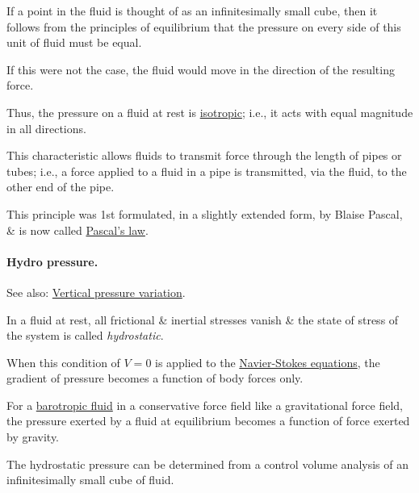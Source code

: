 \documentclass{article}
\begin{document}
If a point in the fluid is thought of as an infinitesimally small cube, then it follows from the principles of equilibrium that the pressure on every side of this unit of fluid must be equal.

If this were not the case, the fluid would move in the direction of the resulting force.

Thus, the pressure on a fluid at rest is \href{https://en.wikipedia.org/wiki/Isotropic}{isotropic}; i.e., it acts with equal magnitude in all directions.

This characteristic allows fluids to transmit force through the length of pipes or tubes; i.e., a force applied to a fluid in a pipe is transmitted, via the fluid, to the other end of the pipe.

This principle was 1st formulated, in a slightly extended form, by Blaise Pascal, \& is now called \href{https://en.wikipedia.org/wiki/Pascal's_law}{Pascal's law}.

\paragraph{Hydro pressure.} See also: \href{https://en.wikipedia.org/wiki/Vertical_pressure_variation}{Vertical pressure variation}.

%
In a fluid at rest, all frictional \& inertial stresses vanish \& the state of stress of the system is called {\it hydrostatic}.

When this condition of $V = 0$ is applied to the \href{https://en.wikipedia.org/wiki/Navier-Stokes_equations}{Navier-Stokes equations}, the gradient of pressure becomes a function of body forces only.

For a \href{https://en.wikipedia.org/wiki/Barotropic_fluid}{barotropic fluid} in a conservative force field like a gravitational force field, the pressure exerted by a fluid at equilibrium becomes a function of force exerted by gravity.

%
The hydrostatic pressure can be determined from a control volume analysis of an infinitesimally small cube of fluid.
\end{document}
